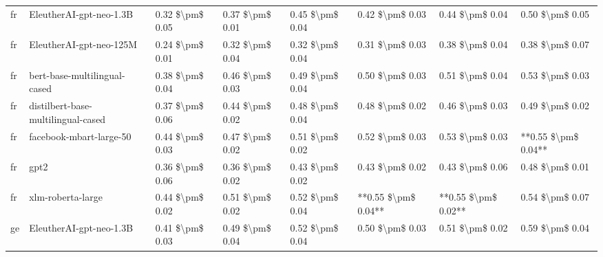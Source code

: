 \begin{tabular}{llllllll}
      fr &            EleutherAI-gpt-neo-1.3B & 0.32 \$\textbackslash pm\$ 0.05 &           0.37 \$\textbackslash pm\$ 0.01 &       0.45 \$\textbackslash pm\$ 0.04 &        0.42 \$\textbackslash pm\$ 0.03 &                         0.44 \$\textbackslash pm\$ 0.04 &     0.50 \$\textbackslash pm\$ 0.05 \\
      fr &            EleutherAI-gpt-neo-125M & 0.24 \$\textbackslash pm\$ 0.01 &           0.32 \$\textbackslash pm\$ 0.04 &       0.32 \$\textbackslash pm\$ 0.04 &        0.31 \$\textbackslash pm\$ 0.03 &                         0.38 \$\textbackslash pm\$ 0.04 &     0.38 \$\textbackslash pm\$ 0.07 \\
      fr &       bert-base-multilingual-cased & 0.38 \$\textbackslash pm\$ 0.04 &           0.46 \$\textbackslash pm\$ 0.03 &       0.49 \$\textbackslash pm\$ 0.04 &        0.50 \$\textbackslash pm\$ 0.03 &                         0.51 \$\textbackslash pm\$ 0.04 &     0.53 \$\textbackslash pm\$ 0.03 \\
      fr & distilbert-base-multilingual-cased & 0.37 \$\textbackslash pm\$ 0.06 &           0.44 \$\textbackslash pm\$ 0.02 &       0.48 \$\textbackslash pm\$ 0.04 &        0.48 \$\textbackslash pm\$ 0.02 &                         0.46 \$\textbackslash pm\$ 0.03 &     0.49 \$\textbackslash pm\$ 0.02 \\
      fr &            facebook-mbart-large-50 & 0.44 \$\textbackslash pm\$ 0.03 &           0.47 \$\textbackslash pm\$ 0.02 &       0.51 \$\textbackslash pm\$ 0.02 &        0.52 \$\textbackslash pm\$ 0.03 &                         0.53 \$\textbackslash pm\$ 0.03 & **0.55 \$\textbackslash pm\$ 0.04** \\
      fr &                               gpt2 & 0.36 \$\textbackslash pm\$ 0.06 &           0.36 \$\textbackslash pm\$ 0.02 &       0.43 \$\textbackslash pm\$ 0.02 &        0.43 \$\textbackslash pm\$ 0.02 &                         0.43 \$\textbackslash pm\$ 0.06 &     0.48 \$\textbackslash pm\$ 0.01 \\
      fr &                  xlm-roberta-large & 0.44 \$\textbackslash pm\$ 0.02 &           0.51 \$\textbackslash pm\$ 0.02 &       0.52 \$\textbackslash pm\$ 0.04 &    **0.55 \$\textbackslash pm\$ 0.04** &                     **0.55 \$\textbackslash pm\$ 0.02** &     0.54 \$\textbackslash pm\$ 0.07 \\
      ge &            EleutherAI-gpt-neo-1.3B & 0.41 \$\textbackslash pm\$ 0.03 &           0.49 \$\textbackslash pm\$ 0.04 &       0.52 \$\textbackslash pm\$ 0.04 &        0.50 \$\textbackslash pm\$ 0.03 &                         0.51 \$\textbackslash pm\$ 0.02 &     0.59 \$\textbackslash pm\$ 0.04 \\

\end{tabular}
